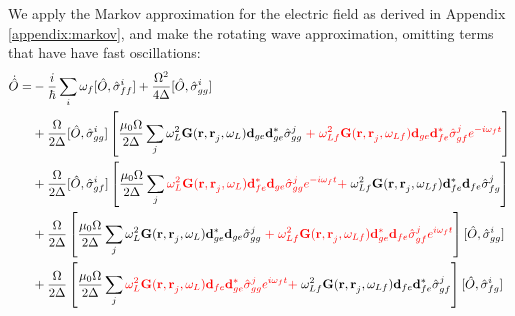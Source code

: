 \documentclass[a4paper, 11pt]{article}
\numberwithin{equation}{section}
\begin{document}
We apply the Markov approximation for the electric field as derived in
Appendix \ref{appendix:markov}, and make the rotating wave approximation, omitting
terms that have have fast oscillations:
\begin{equation}\label{Odot}
  \begin{aligned}
  \dot{\hat{O}} = &-\frac{i}{\hbar}\sum_i \omega_f [\hat{O}, \hat{\sigma}_{ff}^i] +
  \frac{\Omega^2}{4\Delta}[\hat{O}, \hat{\sigma}_{gg}^i]\\&+ \frac{\Omega}{2\Delta}
  [\hat{O}, \hat{\sigma}_{gg}^i]\left[ \frac{\mu_0\Omega}{2\Delta}\sum_j \omega_L^2
  \mathbf{G(r, r}_j, \omega_L) \mathbf{d}_{ge}\mathbf{d}_{ge}^*\hat{\sigma}_{gg}^j\;
  {\color{red}+\;
  \omega_{Lf}^2\mathbf{G(r, r}_j, \omega_{Lf})\mathbf{d}_{ge}\mathbf{d}_{fe}^*
  \hat{\sigma}_{gf}^je^{-i\omega_ft}} \right]\\&+ \frac{\Omega}{2\Delta}
  [\hat{O}, \hat{\sigma}_{gf}^i]\left[ \frac{\mu_0\Omega}{2\Delta}\sum_j {\color{red}\omega_L^2
  \mathbf{G(r, r}_j, \omega_L) \mathbf{d}_{fe}^*\mathbf{d}_{ge}\hat{\sigma}_{gg}^j
e^{-i\omega_ft}+}\; \omega_{Lf}^2\mathbf{G(r, r}_j, \omega_{Lf})\mathbf{d}_{fe}^*
  \mathbf{d}_{fe} \hat{\sigma}_{fg}^j \right] \\&+ \frac{\Omega}{2\Delta}
  \left[ \frac{\mu_0\Omega}{2\Delta}\sum_j \omega_L^2
  \mathbf{G(r, r}_j, \omega_L) \mathbf{d}_{ge}^*\mathbf{d}_{ge}\hat{\sigma}_{gg}^j
  {\color{red}\;+\;
  \omega_{Lf}^2\mathbf{G(r, r}_j, \omega_{Lf})\mathbf{d}_{ge}^*\mathbf{d}_{fe}
\hat{\sigma}_{gf}^je^{i\omega_ft}} \right][\hat{O}, \hat{\sigma}_{gg}^i]\\&+ \frac{\Omega}{2\Delta}
\left[ \frac{\mu_0\Omega}{2\Delta}\sum_j {\color{red}\omega_L^2
  \mathbf{G(r, r}_j, \omega_L) \mathbf{d}_{fe}\mathbf{d}_{ge}^*\hat{\sigma}_{gg}^j
e^{i\omega_ft} +\;}\omega_{Lf}^2\mathbf{G(r, r}_j, \omega_{Lf})\mathbf{d}_{fe}
  \mathbf{d}_{fe}^* \hat{\sigma}_{gf}^j \right][\hat{O}, \hat{\sigma}_{fg}^i]
  \end{aligned}
\end{equation}

\end{document}

